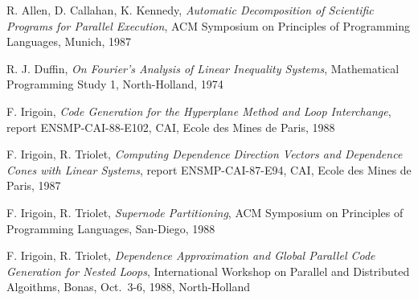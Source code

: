
\begin{thebibliography}{99}

 R. Allen, D. Callahan, K. Kennedy, {\em Automatic
Decomposition of Scientific Programs for Parallel Execution},
ACM Symposium on Principles of Programming Languages, Munich, 1987

 R. J. Duffin,
{\em On Fourier's Analysis of Linear Inequality Systems},
Mathematical Programming Study 1, North-Holland, 1974

 F. Irigoin, {\em Code Generation for the Hyperplane
Method and Loop Interchange},
report ENSMP-CAI-88-E102,
CAI, Ecole des Mines de Paris, 1988

 F. Irigoin, R. Triolet, {\em Computing Dependence Direction
Vectors and Dependence Cones with Linear Systems}, report ENSMP-CAI-87-E94,
CAI, Ecole des Mines de Paris, 1987 

 F. Irigoin, R. Triolet, {\em Supernode Partitioning},
ACM Symposium on Principles of Programming Languages, San-Diego, 1988

 F. Irigoin, R. Triolet, {\em Dependence Approximation
and Global Parallel Code Generation for Nested Loops}, International
Workshop on Parallel and Distributed Algoithms, Bonas, Oct.~3-6, 1988,
North-Holland

\end{thebibliography}

